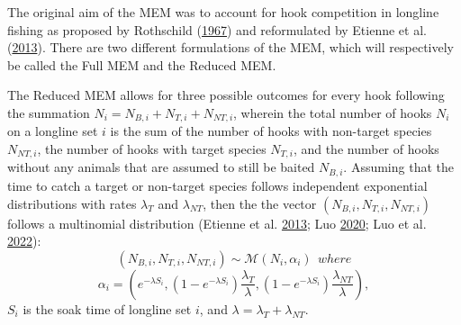 \documentclass[12pt]{article}\usepackage[]{graphicx}\usepackage[]{color}
\begin{document}
The original aim of the MEM was to account for hook competition in longline fishing as proposed by Rothschild (\protect\hyperlink{ref-Rothschild1967}{1967}) and reformulated by Etienne et al. (\protect\hyperlink{ref-Etienne2013}{2013}). There are two different formulations of the MEM, which will respectively be called the Full MEM and the Reduced MEM.

The Reduced MEM allows for three possible outcomes for every hook following the summation \(N_i = N_{B,i}+N_{T,i}+N_{NT,i}\), wherein the total number of hooks \(N_i\) on a longline set \(i\) is the sum of the number of hooks with non-target species \(N_{NT,i}\), the number of hooks with target species \(N_{T,i}\), and the number of hooks without any animals that are assumed to still be baited \(N_{B,i}\). Assuming that the time to catch a target or non-target species follows independent exponential distributions with rates \(\lambda_T\) and \(\lambda_{NT}\), then the the vector \((N_{B,i},N_{T,i},N_{NT,i})\) follows a multinomial distribution (Etienne et al. \protect\hyperlink{ref-Etienne2013}{2013}; Luo \protect\hyperlink{ref-Luo2020}{2020}; Luo et al. \protect\hyperlink{ref-Luo2022}{2022}):
\begin{equation}
(N_{B,i},N_{T,i},N_{NT,i}) \sim \mathcal{M}(N_i,\alpha_i) \ \ where
\end{equation} \begin{equation}
\alpha_i = (e^{-\lambda S_i},(1-e^{-\lambda S_i})\frac{\lambda_T}{\lambda},(1-e^{-\lambda S_i})\frac{\lambda_{NT}}{\lambda}),
\end{equation}
\(S_i\) is the soak time of longline set \(i\), and \(\lambda = \lambda_T + \lambda_{NT}\).
\end{document}
